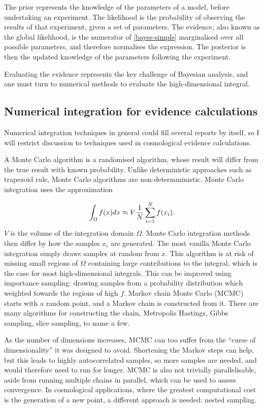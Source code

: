 \documentclass{article}
\begin{document}
The prior represents the knowledge of the parameters of a model, before undertaking an experiment. The likelihood is the probability of observing the results of that experiment, given a set of parameters. The evidence, also known as the global likelihood, is the numerator of \ref{bayes-simple} marginalised over all possible parameters, and therefore normalises the expression. The posterior is then the updated knowledge of the parameters following the experiment.

Evaluating the evidence represents the key challenge of Bayesian analysis, and one must turn to numerical methods to evaluate the high-dimensional integral. 

\subsection{Numerical integration for evidence calculations}
Numerical integration techniques in general could fill several reports by itself, so I will restrict discussion to techniques used in cosmological evidence calculations.

A Monte Carlo algorithm is a randomised algorithm, whose result will differ from the true result with known probability. Unlike deterministic approaches such as trapezoid rule, Monte Carlo algorithms are non-determministic. Monte Carlo integration uses the approximation

\begin{equation}
\int_\Omega f(x) dx \approx V \frac{1}{N}\sum_{i=1}^{N} f(x_i) \textrm .
\end{equation}
%
$V$ is the volume of the integration domain $\Omega$. Monte Carlo integration methods then differ by how the samples $x_i$ are generated. The most vanilla Monte Carlo integration simply draws samples at random from $x$. This algorithm is at risk of missing small regions of $\Omega$ containing large contributions to the integral, which is the case for most high-dimensional integrals. This can be improved using importance sampling: drawing samples from a probability distribution which weighted towards the regions of high $f$. Markov chain Monte Carlo (MCMC) starts with a random point, and a Markov chain is constructed from it. There are many algorithms for constructing the chain, Metropolis Hastings, Gibbs sampling, slice sampling, to name a few. 

As the number of dimensions increases, MCMC can too suffer from the ``curse of dimensionality'' it was designed to avoid. Shortening the Markov steps can help, but this leads to highly autocorrelated samples, so more samples are needed, and would therefore need to run for longer. MCMC is also not trivially parallelisable, aside from running multiple chains in parallel, which can be used to assess convergence. In cosmological applications, where the greatest computational cost is the generation of a new point, a different approach is needed: nested sampling.
\end{document}
